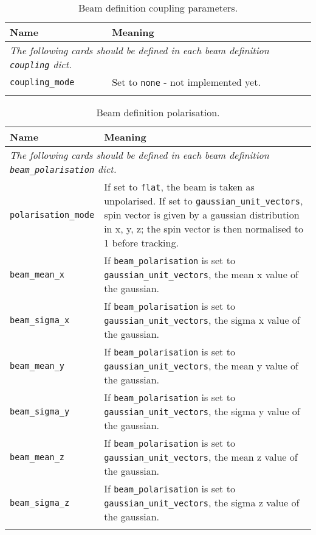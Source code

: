 \begin{table*}
\begin{center}
\caption{Beam definition coupling parameters.}
\begin{tabularx}{\linewidth}{lX}
Name & Meaning \\
\hline
\multicolumn{2}{l}{\emph{The following cards should be defined in each beam definition \verb|coupling| dict.}} \\
\hline
\verb|coupling_mode| & Set to \verb|none| - not implemented yet. \\
\begin{makeimage} %
\end{makeimage} 
\end{tabularx}
\end{center}
\end{table*}

\begin{table*}
\begin{center}
\caption{Beam definition polarisation.}
\begin{tabularx}{\linewidth}{lX}
Name & Meaning \\
\hline
\multicolumn{2}{l}{\emph{The following cards should be defined in each beam definition \verb|beam_polarisation| dict.}} \\
\hline
\verb|polarisation_mode| & If set to \verb|flat|, the beam is taken as unpolarised. If set to \verb|gaussian_unit_vectors|, spin vector is given by a gaussian distribution in x, y, z; the spin vector is then normalised to 1 before tracking. \\
\verb|beam_mean_x| & If \verb|beam_polarisation| is set to \verb|gaussian_unit_vectors|, the mean x value of the gaussian. \\
\verb|beam_sigma_x| & If \verb|beam_polarisation| is set to \verb|gaussian_unit_vectors|, the sigma x value of the gaussian. \\
\verb|beam_mean_y| & If \verb|beam_polarisation| is set to \verb|gaussian_unit_vectors|, the mean y value of the gaussian. \\
\verb|beam_sigma_y| & If \verb|beam_polarisation| is set to \verb|gaussian_unit_vectors|, the sigma y value of the gaussian. \\
\verb|beam_mean_z| & If \verb|beam_polarisation| is set to \verb|gaussian_unit_vectors|, the mean z value of the gaussian. \\
\verb|beam_sigma_z| & If \verb|beam_polarisation| is set to \verb|gaussian_unit_vectors|, the sigma z value of the gaussian. \\
\begin{makeimage} %
\end{makeimage}
\end{tabularx}
\end{center}
\end{table*}


